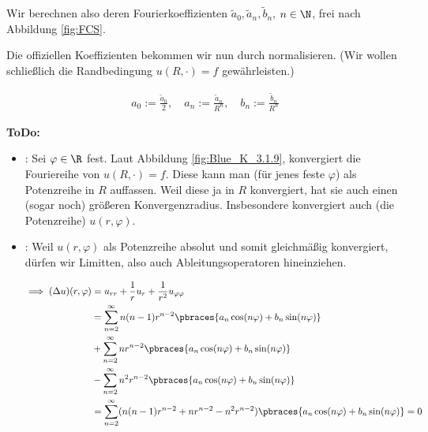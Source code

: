 \begin{solution}
\begin{enumerate}[label = (\roman*)]

    Wir berechnen also deren Fourierkoeffizienten $\tilde{a}_0, \tilde{a}_n, \tilde{b}_n$, $n \in \N$, frei nach Abbildung \ref{fig:FCS}.


    Die offiziellen Koeffizienten bekommen wir nun durch normalisieren.
    (Wir wollen schließlich die Randbedingung $u(R, \cdot) = f$ gewährleisten.)

    \begin{align*}
        a_0 := \frac{\tilde{a}_0}{2}, \quad a_n := \frac{\tilde{a}_n}{R^n},
        \quad
        b_n := \frac{\tilde{b}_n}{R^n}
    \end{align*}

    \textbf{ToDo:}
    \begin{itemize}

        \item {}:
        Sei $\varphi \in \R$ fest.
        Laut Abbildung \ref{fig:Blue_K_3.1.9}, konvergiert die Fouriereihe von $u(R, \cdot) = f$.
        Diese kann man (für jenes feste $\varphi$) als Potenzreihe in $R$ auffassen.
        Weil diese ja in $R$ konvergiert, hat sie auch einen (sogar noch) größeren Konvergenzradius.
        Insbesondere konvergiert auch (die Potenzreihe) $u(r, \varphi)$.

        \item {}:
        Weil $u(r, \varphi)$ als Potenzreihe absolut und somit gleichmäßig konvergiert, dürfen wir Limitten, also auch Ableitungsoperatoren hineinziehen.

        \begin{align*}
            \implies
            (\Delta u)(r, \varphi)
            & =
            u_{rr} + \frac{1}{r} u_r + \frac{1}{r^2} u_{\varphi \varphi} \\
            & =
            \sum_{n=2}^\infty
            n (n-1) r^{n-2}
            \pbraces
            {
                a_n \cos(n \varphi)
                +
                b_n \sin(n \varphi)
            } \\
            & +
            \sum_{n=2}^\infty
            n r^{n-2}
            \pbraces
            {
                a_n \cos(n \varphi)
                +
                b_n \sin(n \varphi)
            } \\
            & -
            \sum_{n=2}^\infty
            n^2 r^{n-2}
            \pbraces
            {
                a_n \cos(n \varphi)
                +
                b_n \sin(n \varphi)
            } \\
            & =
            \sum_{n=2}^\infty
            (
                n (n-1) r^{n-2}
                +
                n r^{n-2}
                -
                n^2 r^{n-2}
            )
            \pbraces
            {
                a_n \cos(n \varphi)
                +
                b_n \sin(n \varphi)
            }
            = 0
        \end{align*}


\end{itemize}
\end{enumerate}
\end{solution}
